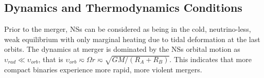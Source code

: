 \subsection{Dynamics and Thermodynamics Conditions} \label{sec:intro:remnant}

Prior to the merger, \acp{NS} can be considered as being in the cold, neutrino-less, 
weak equilibrium with only marginal heating due to tidal deformation at the last orbits.
The dynamics at merger is dominated by the \acp{NS} orbital motion
as $\upsilon_{rad}\ll\upsilon_{orb}$, 
that is $\upsilon_{orb}\eqsim\Omega r\eqsim\sqrt{GM/(R_A + R_B)}$.
This indicates that 
more compact binaries experience more rapid, more violent mergers.


